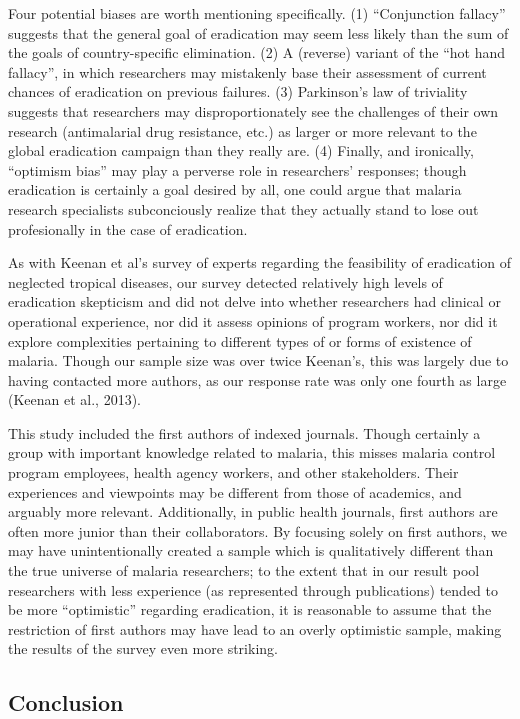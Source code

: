 \documentclass[]{article}
\begin{document}
Four potential biases are worth mentioning specifically. (1)
``Conjunction fallacy'' suggests that the general goal of eradication
may seem less likely than the sum of the goals of country-specific
elimination. (2) A (reverse) variant of the ``hot hand fallacy'', in
which researchers may mistakenly base their assessment of current
chances of eradication on previous failures. (3) Parkinson's law of
triviality suggests that researchers may disproportionately see the
challenges of their own research (antimalarial drug resistance, etc.) as
larger or more relevant to the global eradication campaign than they
really are. (4) Finally, and ironically, ``optimism bias'' may play a
perverse role in researchers' responses; though eradication is certainly
a goal desired by all, one could argue that malaria research specialists
subconciously realize that they actually stand to lose out profesionally
in the case of eradication.

As with Keenan et al's survey of experts regarding the feasibility of
eradication of neglected tropical diseases, our survey detected
relatively high levels of eradication skepticism and did not delve into
whether researchers had clinical or operational experience, nor did it
assess opinions of program workers, nor did it explore complexities
pertaining to different types of or forms of existence of malaria.
Though our sample size was over twice Keenan's, this was largely due to
having contacted more authors, as our response rate was only one fourth
as large (Keenan et al., 2013).

This study included the first authors of indexed journals. Though
certainly a group with important knowledge related to malaria, this
misses malaria control program employees, health agency workers, and
other stakeholders. Their experiences and viewpoints may be different
from those of academics, and arguably more relevant. Additionally, in
public health journals, first authors are often more junior than their
collaborators. By focusing solely on first authors, we may have
unintentionally created a sample which is qualitatively different than
the true universe of malaria researchers; to the extent that in our
result pool researchers with less experience (as represented through
publications) tended to be more ``optimistic'' regarding eradication, it
is reasonable to assume that the restriction of first authors may have
lead to an overly optimistic sample, making the results of the survey
even more striking.

\subsection{Conclusion}\label{conclusion}
\end{document}
